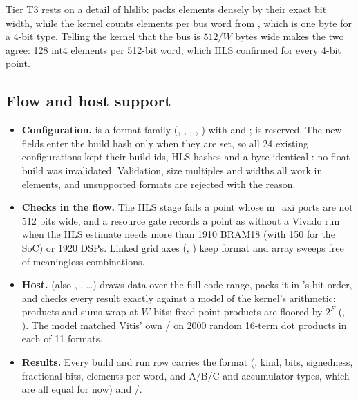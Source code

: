 Tier T3 rests on a detail of hlslib:  packs  elements densely by their exact bit width,
while the kernel counts elements per bus word from , which is one byte for a 4-bit type.
Telling the kernel that the bus is \(512/W\) bytes wide makes the two agree: 128 int4 elements per 512-bit word, which
HLS confirmed for every 4-bit point.

\subsection{Flow and host support}
\begin{itemize}
  \item \textbf{Configuration.}  is a format family (, , ,
        , ) with  and ;  is reserved.
        The new fields enter the build hash only when they are set, so all 24 existing configurations kept their build
        ids, HLS hashes and a byte-identical : no float build was invalidated. Validation, size multiples
        and  widths all work in elements, and unsupported formats are rejected with the reason.
  \item \textbf{Checks in the flow.} The HLS stage fails a point whose m\_axi ports are not 512 bits wide, and a
        resource gate records a point as  without a Vivado run when the HLS estimate needs more
        than 1910 BRAM18 (with 150 for the SoC) or 1920 DSPs. Linked grid axes (, )
        keep format and array sweeps free of meaningless combinations.
  \item \textbf{Host.}  (also , , \dots) draws data over the
        full code range, packs it in 's bit order, and checks every result exactly against a model of the
        kernel's arithmetic: products and sums wrap at \(W\) bits; fixed-point products are floored by \(2^F\)
        (, ). The model matched Vitis' own / on 2000 random
        16-term dot products in each of 11 formats.
  \item \textbf{Results.} Every build and run row carries the format (, kind, bits, signedness,
        fractional bits, elements per word, and A/B/C and accumulator types, which are all equal for now) and
        /.
\end{itemize}

